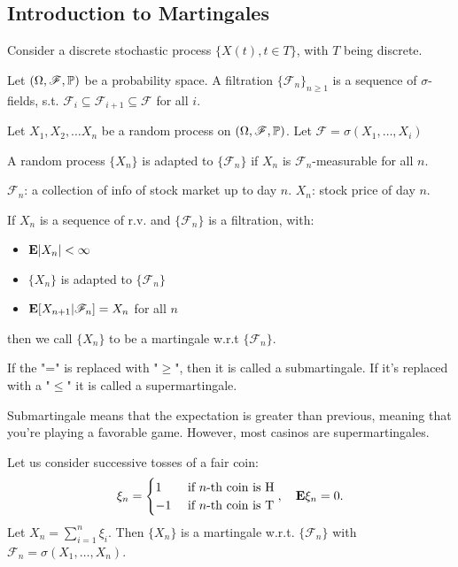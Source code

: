 \documentclass[../main/main.tex]{subfiles}
\begin{document}
\subsection{Introduction to Martingales}
Consider a discrete stochastic process $\{X(t), t \in T\}$, with $T$ being discrete.
\begin{definition} Let $(\Omega, \mathscr{F} ,\P)$ be a probability space. A filtration $\{\mathscr{F}_n\}_{n \geq 1}$ is a sequence of $\sigma$-fields, s.t. $\mathscr{F}_i \subseteq \mathscr{F}_{i+1}\subseteq \mathscr{F}$ for all $i$.
\end{definition}
Let $X_1, X_2, \ldots X_n$ be a random process on $(\Omega, \mathscr{F}, \P)$. Let $\mathscr{F} = \sigma(X_1, \ldots, X_i)$
\begin{definition} A random process $\{X_n\}$ is adapted to $\{\mathscr{F}_n\}$ if $X_n$ is $\mathscr{F}_n$-measurable for all $n$.
\end{definition}
\begin{example}
	$\mathscr{F}_n$: a collection of info of stock market up to day $n$. $X_n$: stock price of day $n$.
\end{example}
\begin{definition} If $X_n$ is a sequence of r.v. and $\{\mathscr{F}_n\}$ is a filtration, with:
	\begin{itemize}
		\item $\E|X_n| < \infty$
		\item $\{X_n\}$ is adapted to $\{\mathscr{F}_n\}$
		\item $\E[X_{n+1}| \mathscr{F}_n] = X_n$ for all $n$
	\end{itemize}
	then we call $\{X_n\}$ to be a martingale w.r.t $\{\mathscr{F}_n\}$.
\end{definition}
\begin{definition} If the "=" is replaced with "$\geq$", then it is called a submartingale. If it's replaced with a "$\leq$" it is called a supermartingale.
\end{definition}
\begin{remark}
	Submartingale means that the expectation is greater than previous, meaning that you're playing a favorable game. However, most casinos are supermartingales.
\end{remark}

\begin{example}Let us consider successive tosses of a fair coin: \[
		\xi_n = \begin{cases}
			1  & \text{ if $n$-th coin is H} \\
			-1 & \text{ if $n$-th coin is T}
		\end{cases}, \quad \E \xi_n = 0.
	\] Let $X_n = \sum\limits_{i=1}^{n} \xi_i$. Then $\{X_n\}$ is a martingale w.r.t. $\{\mathscr{F}_n\}$ with $\mathscr{F}_n = \sigma(X_1, \ldots , X_n)$.
\end{example}
\end{document}
